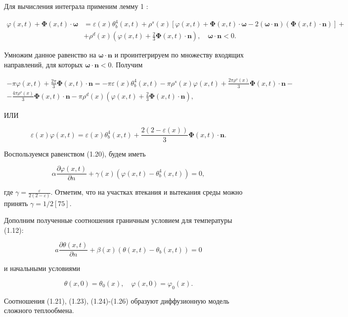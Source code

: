 \documentclass[10pt]{article}
\begin{document}
Для вычисления интеграла применим лемму 1 :

$$
\begin{aligned}
\varphi(x, t)+\boldsymbol{\Phi}(x, t) \cdot \boldsymbol{\omega} &=\varepsilon(x) \theta_{b}^{4}(x, t)+\rho^{s}(x)[\varphi(x, t)+\boldsymbol{\Phi}(x, t) \cdot \boldsymbol{\omega}-2(\boldsymbol{\omega} \cdot \mathbf{n})(\boldsymbol{\Phi}(x, t) \cdot \mathbf{n})]+\\
&+\rho^{d}(x)\left(\varphi(x, t)+\frac{2}{3} \boldsymbol{\Phi}(x, t) \cdot \mathbf{n}\right), \quad \boldsymbol{\omega} \cdot \mathbf{n}<0 .
\end{aligned}
$$

Умножим данное равенство на $\boldsymbol{\omega} \cdot \mathbf{n}$ и проинтегрируем по множеству входящих направлений, для которых $\boldsymbol{\omega} \cdot \mathbf{n}<0$. Получим

$$
\begin{gathered}
-\pi \varphi(x, t)+\frac{2 \pi}{3} \boldsymbol{\Phi}(x, t) \cdot \mathbf{n}=-\pi \varepsilon(x) \theta_{b}^{4}(x, t)-\pi \rho^{s}(x) \varphi(x, t)+\frac{2 \pi \rho^{s}(x)}{3} \boldsymbol{\Phi}(x, t) \cdot \mathbf{n}- \\
-\frac{4 \pi \rho^{s}(x)}{3} \boldsymbol{\Phi}(x, t) \cdot \mathbf{n}-\pi \rho^{d}(x)\left(\varphi(x, t)+\frac{2}{3} \boldsymbol{\Phi}(x, t) \cdot \mathbf{n}\right),
\end{gathered}
$$

ИЛИ

$$
\varepsilon(x) \varphi(x, t)=\varepsilon(x) \theta_{b}^{4}(x, t)+\frac{2(2-\varepsilon(x))}{3} \boldsymbol{\Phi}(x, t) \cdot \mathbf{n} .
$$

Воспользуемся равенством (1.20), будем иметь

$$
\alpha \frac{\partial \varphi(x, t)}{\partial n}+\gamma(x)\left(\varphi(x, t)-\theta_{b}^{4}(x, t)\right)=0,
$$

где $\gamma=\frac{\varepsilon}{2(2-\varepsilon)}$. Отметим, что на участках втекания и вытекания среды можно принять $\gamma=1 / 2[75]$.

Дополним полученные соотношения граничным условием для температуры (1.12):

$$
a \frac{\partial \theta(x, t)}{\partial n}+\beta(x)\left(\theta(x, t)-\theta_{b}(x, t)\right)=0
$$

и начальными условиями

$$
\theta(x, 0)=\theta_{0}(x), \quad \varphi(x, 0)=\varphi_{0}(x) .
$$

Соотношения (1.21), (1.23), (1.24)-(1.26) образуют диффузионную модель сложного теплообмена.
\end{document}
